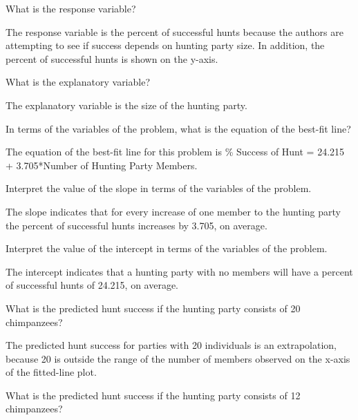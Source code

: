 \documentclass[10pt,openany]{book}\usepackage[]{graphicx}\usepackage[]{color}
\begin{document}
\begin{QAlist}
  \item What is the response variable?
  \begin{QAlist}
    \item The response variable is the percent of successful hunts because the authors are attempting to see if success depends on hunting party size.  In addition, the percent of successful hunts is shown on the y-axis.
  \end{QAlist}
  \item What is the explanatory variable?
  \begin{QAlist}
    \item The explanatory variable is the size of the hunting party.
  \end{QAlist}
  \item In terms of the variables of the problem, what is the equation of the best-fit line?
  \begin{QAlist}
    \item The equation of the best-fit line for this problem is \% Success of Hunt = 24.215 + 3.705*Number of Hunting Party Members.
  \end{QAlist}
  \item Interpret the value of the slope in terms of the variables of the problem.
  \begin{QAlist}
    \item The slope indicates that for every increase of one member to the hunting party the percent of successful hunts increases by 3.705, on average.
  \end{QAlist}
  \item Interpret the value of the intercept in terms of the variables of the problem.
  \begin{QAlist}
    \item The intercept indicates that a hunting party with no members will have a percent of successful hunts of 24.215, on average.
  \end{QAlist}
  \item What is the predicted hunt success if the hunting party consists of 20 chimpanzees?
  \begin{QAlist}
    \item The predicted hunt success for parties with 20 individuals is an extrapolation, because 20 is outside the range of the number of members observed on the x-axis of the fitted-line plot.
  \end{QAlist}
  \item What is the predicted hunt success if the hunting party consists of 12 chimpanzees?

\end{QAlist}
\end{document}
